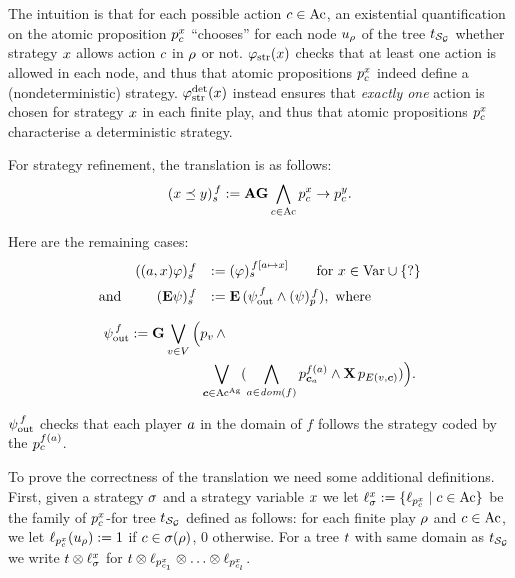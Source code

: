 The intuition is that for each possible action $\mov\in\Mov$, an
existential quantification on the atomic proposition $p_{\mov}^{\var}$
``chooses'' for each  node $\noeud_{\fplay}$ of the tree 
$\unfold[\KS_{\CGS}]{\sstate_{{\pos_0}}}$ whether strategy $\var$
allows action $\mov$ in $\fplay$ or not. 
$\phistrat$  checks that at least one action is allowed in each
node, and thus that atomic propositions
$p_{\mov}^{\var}$ indeed define a (nondeterministic) strategy.
$\phistratdet$ instead ensures that \emph{exactly one} action is chosen for strategy $\var$  in each finite
play, and thus that atomic propositions
$p_{\mov}^{\var}$  characterise a
deterministic strategy.

For strategy refinement, the translation is as follows:
\[\tr[f]{\var \refines \varb} \egdef \A\always\biget_{\mov\in\Mov} p_\mov^\var
  \impl p_\mov^{\varb}.\]

Here are the remaining cases:
\[
\begin{array}{lrl}
& \tr[f]{\bind{\var}\phi}	& \egdef \tr[{f[\ag\mapsto \var]}]{\phi} \quad\quad
                          \text{for }\var\in\Varf\union\{\unb\}  \\[5pt]
\mbox{and} & \tr[f]{\Eout\psi}	& \egdef \E\,(\psiout[f] \wedge
                                 \trp[f]{\psi}), \mbox{ where}
\end{array}
\]

\begin{align*}
\psiout[f]  \egdef \always
  \bigou_{\pos\in\setpos}\Big( & p_{\pos}\, \et  \\
  & \bigou_{\jmov\in\Mov^{\Agf}} 
  (\biget_{\ag\in\dom(f)}p_{\jmov_{\ag}}^{f(\ag)}\et \X\,
                          p_{\trans(\pos,\jmov)}) \Big ).  
\end{align*}

                      
$\psiout[f]$ checks that  each player $\ag$ in the domain of $f$
follows the strategy coded by the $p_\act^{f(\ag)}$. 

   
To prove the correctness of the translation we need some additional
definitions. First, given a strategy $\strat$ and
a strategy variable $\var$ we
let  $\stratlab{\var}\egdef\{\plab[{p_\act^\var}]\mid
\act\in\Act\}$ be the family of $p_\act^\var$- for tree
$\unfold[\KS_{\CGS}]{}$ defined as follows: for each
finite play $\fplay$ and $\act\in\Act$,
we let $\plab[{p_\act^\var}](\noeud_\fplay)\egdef1$ if $\act\in\strat(\fplay)$, 0 otherwise.
For a  tree $\ltree$ with same domain as
$\unfold[\KS_{\CGS}]{}$ we write $\ltree\prodlab \stratlab{\var}$ for
$\ltree\prodlab \plab[{p_{\act_1}^\var}]\prodlab\ldots\prodlab \plab[{p_{\act_\maxmov}^\var}]$.

